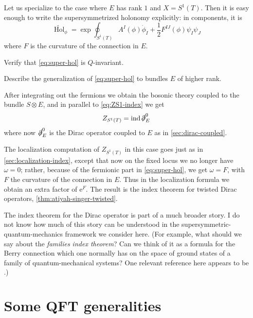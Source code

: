 \documentclass[12pt,letterpaper,reqno]{article}
\numberwithin{equation}{section}
\newcommand{\half}{\ensuremath{\frac{1}{2}}}
\newcommand{\dirac}{\slashed{\partial}}
\newcommand{\e}{{\mathrm e}}
\newcommand{\ti}[1]{\textit{#1}}
\DeclareMathOperator{\ind}{ind}
\DeclareMathOperator{\Hol}{Hol}
\newcommand{\fixme}[1]{{\color{orange}{[#1]}}}
\begin{document}
Let us specialize to the case where $E$ has rank $1$ and $X = S^1(T)$.
Then it is easy enough to write the supersymmetrized
holonomy explicitly: in components, it is
\begin{equation} \label{eq:super-hol}
  \widetilde{\Hol}_\phi = \exp \oint_{S^1(T)} A^I(\phi) \dot \phi_I + \half F^{IJ}(\phi) \psi_I \psi_J
\end{equation}
where $F$ is the curvature of the connection in $E$.

\begin{exercise}
Verify that \eqref{eq:super-hol} is $Q$-invariant.
\end{exercise}

\begin{exercise}
Describe the generalization of \eqref{eq:super-hol} to bundles $E$ of higher rank. \fixme{hard?}
\end{exercise}

After integrating out the fermions we obtain the
bosonic theory coupled to the bundle $S \otimes E$, and
in parallel to \eqref{eq:ZS1-index} we get
\begin{equation}
  Z_{S^1(T)} = \ind \dirac^0_E
\end{equation}
where now $\dirac^0_E$ is the Dirac operator coupled to $E$ as
in \autoref{sec:dirac-coupled}.

The localization computation of $Z_{S^1(T)}$ in this case goes just as in
\autoref{sec:localization-index},
except that now on the fixed locus we no longer have $\omega = 0$; rather,
because of the fermionic part in \eqref{eq:super-hol}, we get $\omega = F$, 
with $F$ the curvature of the connection in $E$. Thus in the localization formula we obtain
an extra factor of $\e^F$. The result is the index theorem
for twisted Dirac operators, \autoref{thm:atiyah-singer-twisted}.

\fixme{case of higher rank $E$}

The index theorem for the Dirac operator is part of a much broader
story. I do not know how much of this story can be understood in the
supersymmetric-quantum-mechanics framework we consider here.
(For example, what should we say about the \ti{families index theorem}?
Can we think of it as a formula for the Berry connection which one normally has 
on the space of ground states of a family of quantum-mechanical systems?
One relevant reference here appears to be \cite{Alvarez2009}.)


\section{Some QFT generalities}
\end{document}
